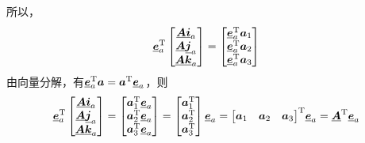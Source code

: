 所以，
\begin{equation}
	\ubm{e}_a^\T 
	\begin{bmatrix}
		\ubm{A} \ubm{i}_a \\
		\ubm{A} \ubm{j}_a \\
		\ubm{A} \ubm{k}_a
	\end{bmatrix}
	=
	\begin{bmatrix}
		\ubm{e}_a^\T \bm{a}_1 \\
		\ubm{e}_a^\T \bm{a}_2 \\
		\ubm{e}_a^\T \bm{a}_3 
	\end{bmatrix}
\end{equation}
由向量分解，有$\ubm{e}_a^\T \bm{a} = \bm{a}^\T \ubm{e}_a$，则
\begin{equation}
	\ubm{e}_a^\T 
	\begin{bmatrix}
		\ubm{A} \ubm{i}_a \\
		\ubm{A} \ubm{j}_a \\
		\ubm{A} \ubm{k}_a
	\end{bmatrix}
	= 
	\begin{bmatrix}
		\bm{a}_1^\T \ubm{e}_a\\
		\bm{a}_2^\T \ubm{e}_a\\
		\bm{a}_3^\T \ubm{e}_a
	\end{bmatrix}
	= 
	\begin{bmatrix}
		\bm{a}_1^\T \\
		\bm{a}_2^\T \\
		\bm{a}_3^\T
	\end{bmatrix}
	\ubm{e}_a 
	= \big[ \bm{a}_1 \quad \bm{a}_2 \quad \bm{a}_3 \big]^\T \ubm{e}_a
	= \ubm{A}^\T \ubm{e}_a
\end{equation}

\vspace*{-1.5em}

